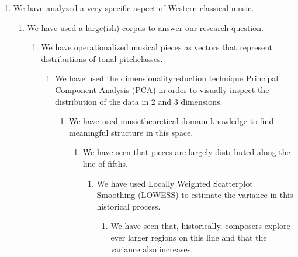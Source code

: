 \documentclass[letterpaper,10pt,english]{sphinxmanual}
\begin{document}
\begin{enumerate}
%
\item {} 
We have analyzed a very specific aspect of Western classical music.




\begin{enumerate}
%
\setcounter{enumii}{1}
\item {} 
We have used a large(\sphinxhyphen{}ish) corpus to answer our research question.




\begin{enumerate}
%
\setcounter{enumiii}{2}
\item {} 
We have operationalized musical pieces as vectors that
represent distributions of tonal pitch\sphinxhyphen{}classes.




\begin{enumerate}
%
\setcounter{enumiv}{3}
\item {} 
We have used the dimensionality\sphinxhyphen{}reduction technique
Principal Component Analysis (PCA) in order to visually
inspect the distribution of the data in 2 and 3 dimensions.




\begin{enumerate}
%
\setcounter{enumv}{4}
\item {} 
We have used music\sphinxhyphen{}theoretical domain knowledge to find
meaningful structure in this space.




\begin{enumerate}
%
\setcounter{enumvi}{5}
\item {} 
We have seen that pieces are largely distributed along
the line of fifths.




\begin{enumerate}
%
\setcounter{enumvii}{6}
\item {} 
We have used Locally Weighted Scatterplot Smoothing
(LOWESS) to estimate the variance in this
historical process.




\begin{enumerate}
%
\setcounter{enumviii}{7}
\item {} 
We have seen that, historically, composers
explore ever larger regions on this line and
that the variance also increases.




\end{enumerate}
\end{enumerate}
\end{enumerate}
\end{enumerate}
\end{enumerate}
\end{enumerate}
\end{enumerate}
\end{enumerate}
\end{document}
